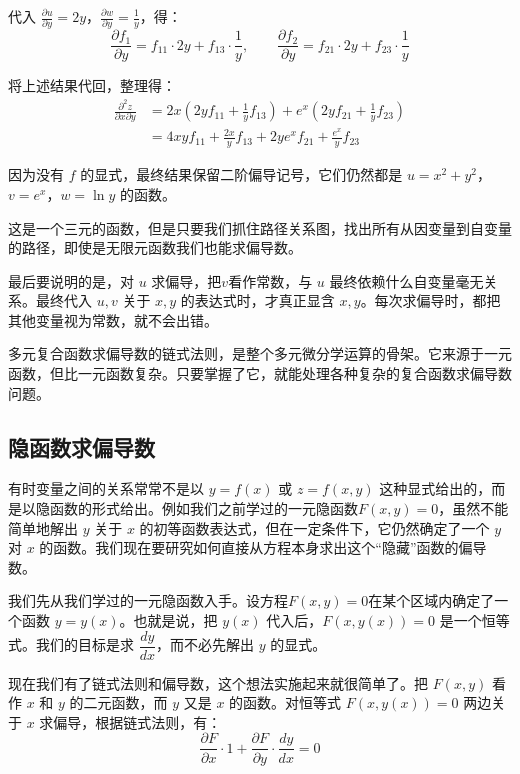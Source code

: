 \begin{myexample}
代入 \(\frac{\partial u}{\partial y} = 2y\)，\(\frac{\partial w}{\partial y} = \frac{1}{y}\)，得：
\[
\frac{\partial f_1}{\partial y} = f_{11} \cdot 2y + f_{13} \cdot \frac{1}{y},\qquad
\frac{\partial f_2}{\partial y} = f_{21} \cdot 2y + f_{23} \cdot \frac{1}{y}
\]

将上述结果代回，整理得：
\begin{align*}
\frac{\partial^2 z}{\partial x \partial y}
&= 2x( 2y f_{11} + \frac{1}{y} f_{13} ) + e^x( 2y f_{21} + \frac{1}{y} f_{23} ) \\
&= 4xy f_{11} + \frac{2x}{y} f_{13} + 2y e^x f_{21} + \frac{e^x}{y} f_{23}
\end{align*}

因为没有 \(f\) 的显式，最终结果保留二阶偏导记号，它们仍然都是 \(u = x^2 + y^2\)，\(v = e^x\)，\(w = \ln y\) 的函数。
\end{myexample}

这是一个三元的函数，但是只要我们抓住路径关系图，找出所有从因变量到自变量的路径，即使是无限元函数我们也能求偏导数。

最后要说明的是，对 $u$ 求偏导，把$v$看作常数，与 $u$ 最终依赖什么自变量毫无关系。最终代入 $u,v$ 关于 $x,y$ 的表达式时，才真正显含 $x,y$。每次求偏导时，都把其他变量视为常数，就不会出错。

多元复合函数求偏导数的链式法则，是整个多元微分学运算的骨架。它来源于一元函数，但比一元函数复杂。只要掌握了它，就能处理各种复杂的复合函数求偏导数问题。

\subsection{隐函数求偏导数}

有时变量之间的关系常常不是以 $y = f(x)$ 或 $z = f(x,y)$ 这种显式给出的，而是以隐函数的形式给出。例如我们之前学过的一元隐函数$F(x, y) = 0$，虽然不能简单地解出 $y$ 关于 $x$ 的初等函数表达式，但在一定条件下，它仍然确定了一个 $y$ 对 $x$ 的函数。我们现在要研究如何直接从方程本身求出这个“隐藏”函数的偏导数。

我们先从我们学过的一元隐函数入手。设方程$F(x, y) = 0$在某个区域内确定了一个函数 $y = y(x)$。也就是说，把 $y(x)$ 代入后，$F(x, y(x)) = 0$ 是一个恒等式。我们的目标是求 $\dfrac{dy}{dx}$，而不必先解出 $y$ 的显式。

现在我们有了链式法则和偏导数，这个想法实施起来就很简单了。把 $F(x,y)$ 看作 $x$ 和 $y$ 的二元函数，而 $y$ 又是 $x$ 的函数。对恒等式 $F(x, y(x)) = 0$ 两边关于 $x$ 求偏导，根据链式法则，有：
\[
\frac{\partial F}{\partial x} \cdot 1 + \frac{\partial F}{\partial y} \cdot \frac{dy}{dx} = 0
\]


